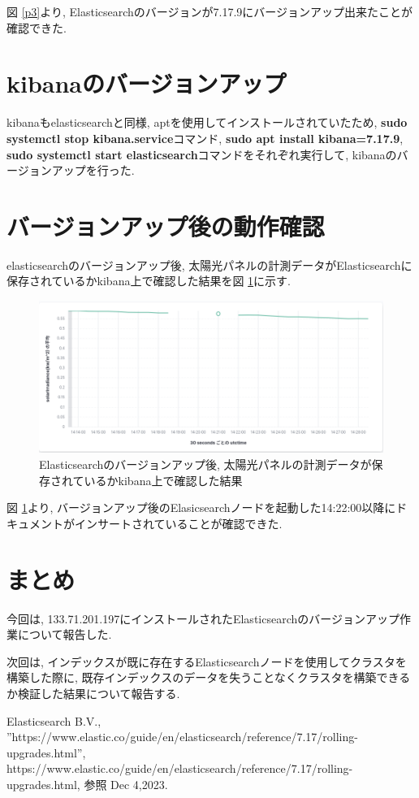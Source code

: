 \documentclass[a4j,12pt,]{jarticle}
\begin{document}
図 \ref{p3}より, Elasticsearchのバージョンが7.17.9にバージョンアップ出来たことが確認できた.

\section{kibanaのバージョンアップ}

kibanaもelasticsearchと同様, aptを使用してインストールされていたため, \textbf{sudo systemctl stop kibana.service}コマンド, \textbf{sudo apt install kibana=7.17.9}, \textbf{sudo systemctl start elasticsearch}コマンドをそれぞれ実行して, kibanaのバージョンアップを行った.

\section{バージョンアップ後の動作確認}

elasticsearchのバージョンアップ後, 太陽光パネルの計測データがElasticsearchに保存されているかkibana上で確認した結果を図 \ref{p4}に示す.

\begin{figure}[H]
  \begin{center}
    \includegraphics[width=160mm]{downtime.png}
    \caption{Elasticsearchのバージョンアップ後, 太陽光パネルの計測データが保存されているかkibana上で確認した結果}
    \label{p4}
  \end{center}
\end{figure}

図 \ref{p4}より, バージョンアップ後のElasicsearchノードを起動した14:22:00以降にドキュメントがインサートされていることが確認できた.

\section{まとめ}
今回は, 133.71.201.197にインストールされたElasticsearchのバージョンアップ作業について報告した.

次回は, インデックスが既に存在するElasticsearchノードを使用してクラスタを構築した際に, 既存インデックスのデータを失うことなくクラスタを構築できるか検証した結果について報告する.

\begin{thebibliography}{5}
  Elasticsearch B.V.,\\ ”https://www.elastic.co/guide/en/elasticsearch/reference/7.17/rolling-upgrades.html”, https://www.elastic.co/guide/en/elasticsearch/reference/7.17/rolling-upgrades.html, 参照 Dec 4,2023.
\end{thebibliography}
\end{document}
